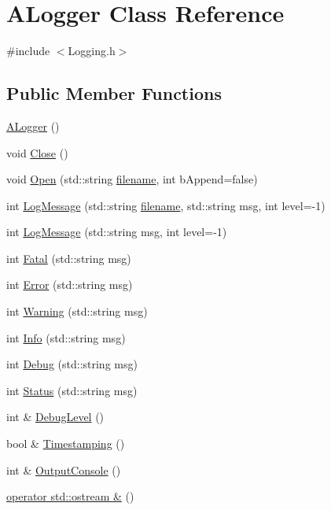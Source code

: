 \hypertarget{classALogger}{\section{A\-Logger Class Reference}
\label{classALogger}
}


{\ttfamily \#include $<$Logging.\-h$>$}

\subsection*{Public Member Functions}
\begin{DoxyCompactItemize}
\item 
\hyperlink{classALogger_a58faf4ee6703c1579d67abd6bf349666}{A\-Logger} ()
\item 
void \hyperlink{classALogger_a21af98bd1c9fdbde4098d2b242cb9ea9}{Close} ()
\item 
void \hyperlink{classALogger_aecec26cddee0a644ae8ac096b2c016ca}{Open} (std\-::string \hyperlink{classALogger_a963caefa4b53d7fc416744c0150257af}{filename}, int b\-Append=false)
\item 
int \hyperlink{classALogger_a55589cb378e3623a35c6057613b818a3}{Log\-Message} (std\-::string \hyperlink{classALogger_a963caefa4b53d7fc416744c0150257af}{filename}, std\-::string msg, int level=-\/1)
\item 
int \hyperlink{classALogger_a791e035a97c7d5f4ea809288290d43ec}{Log\-Message} (std\-::string msg, int level=-\/1)
\item 
int \hyperlink{classALogger_a040e23b0907c20b1bc33ad438eeae387}{Fatal} (std\-::string msg)
\item 
int \hyperlink{classALogger_a6a5eae7afd2d2ecb285094695ef7412e}{Error} (std\-::string msg)
\item 
int \hyperlink{classALogger_a222284c08bb2192d0ec9d1746fe248dc}{Warning} (std\-::string msg)
\item 
int \hyperlink{classALogger_a9b3186e34f76917f8eed4f789f160f8d}{Info} (std\-::string msg)
\item 
int \hyperlink{classALogger_a5f55d3c517fd61412af827229fdc1bf7}{Debug} (std\-::string msg)
\item 
int \hyperlink{classALogger_af08cbc4a4e317bfe9907baa3aceb8485}{Status} (std\-::string msg)
\item 
int \& \hyperlink{classALogger_a1c9a40f9a8b0067adbb5fc795e3bd5b5}{Debug\-Level} ()
\item 
bool \& \hyperlink{classALogger_acabf9035c4ee58fbe49b251bfc245650}{Timestamping} ()
\item 
int \& \hyperlink{classALogger_aff003fac697a2418e34d9edee7cb2d3d}{Output\-Console} ()
\item 
\hyperlink{classALogger_a48c1c2a99a7d0926316740f70e0efff7}{operator std\-::ostream \&} ()
\end{DoxyCompactItemize}
